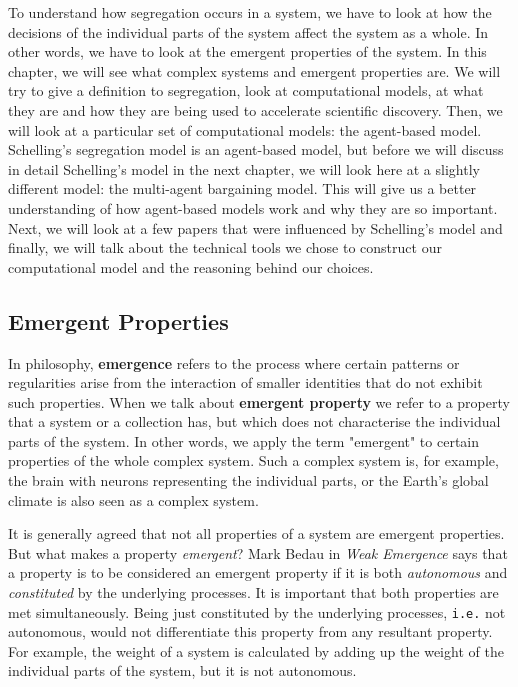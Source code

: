 \documentclass[../main.tex]{subfiles}
\begin{document}
To understand how segregation occurs in a system, we have to look at how the decisions of the individual parts of the system affect the system as a whole. In other words, we have to look at the emergent properties of the system. In this chapter, we will see what complex systems and emergent properties are. We will try to give a definition to segregation, look at computational models, at what they are and how they are being used to accelerate scientific discovery. Then, we will look at a particular set of computational models: the agent-based model. Schelling's segregation model is an agent-based model, but before we will discuss in detail Schelling's model in the next chapter, we will look here at a slightly different model: the multi-agent bargaining model. This will give us a better understanding of how agent-based models work and why they are so important. Next, we will look at a few papers that were influenced by Schelling's model and finally, we will talk about the technical tools we chose to construct our computational model and the reasoning behind our choices.

\subsection{Emergent Properties}

In philosophy, \textbf{emergence} refers to the process where certain patterns or regularities arise from the interaction of smaller identities that do not exhibit such properties. When we talk about \textbf{emergent property} we refer to a property that a system or a collection has, but which does not characterise the individual parts of the system. In other words, we apply the term "emergent" to certain properties of the whole complex system. Such a complex system is, for example, the brain with neurons representing the individual parts, or the Earth's global climate is also seen as a complex system. 

It is generally agreed that not all properties of a system are emergent properties. But what makes a property \textit{emergent}? Mark Bedau in \textit{Weak Emergence}\cite[]{bedau_weakEmergence} says that a property is to be considered an emergent property if it is both \textit{autonomous} and \textit{constituted} by the underlying processes. It is important that both properties are met simultaneously. Being just constituted by the underlying processes, \verb|i.e.| not autonomous, would not differentiate this property from any resultant property. For example, the weight of a system is calculated by adding up the weight of the individual parts of the system, but it is not autonomous. 
\end{document}
